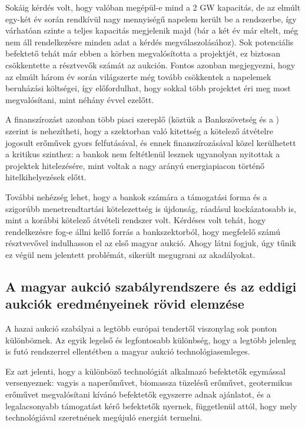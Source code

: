 \documentclass[twoside, magyar, showtrims]{corvinusphd}
\theoremstyle{plain}
\theoremstyle{remark}
\theoremstyle{definition}
\begin{document}
Sokáig kérdés volt, hogy valóban megépül-e mind a 2 GW kapacitás,
de az elmúlt egy-két év során rendkívül nagy mennyiségű
napelem került be a rendszerbe, így várhatóan szinte a teljes
kapacitás megjelenik majd (bár a két év 
már eltelt, még nem áll rendelkezésre minden adat
a kérdés megválaszolásához). Sok potenciális befektető tehát 
már ebben a körben megvalósította a projektjét, ez biztosan
csökkentette a résztvevők számát az aukción. Fontos azonban megjegyezni,
hogy az elmúlt három év során világszerte még tovább csökkentek 
a napelemek beruházási költségei, így előfordulhat, hogy
sokkal több projektet éri meg most megvalósítani, mint 
néhány évvel ezelőtt.

A finanszírozást azonban több piaci szereplő
(köztük a Bankszövetség és a ) szerint is nehezítheti,
hogy a szektorban való kitettség a kötelező átvételre
jogosult erőművek gyors felfutásával, 
és ennek finanszírozásával közel kerülhetett a kritikus szinthez:
a bankok nem feltétlenül lesznek ugyanolyan nyitottak
a projektek hitelezésére, mint voltak a nagy arányú
energiapiacon történő hitelkihelyezések előtt.

További nehézség lehet, 
hogy a bankok számára a támogatási forma  
és a szigorúbb menetrendtartási kötelezettség is újdonság,
ráadásul kockázatosabb is, mint a korábbi kötelező átvételi
rendszer volt. Kérdéses volt tehát, hogy rendelkezésre fog-e állni
kellő forrás a bankszektorból, hogy megfelelő számú
résztvevővel indulhasson el az első magyar aukció.
Ahogy látni fogjuk, úgy tűnik ez végül nem jelentett problémát,
sikerült megugrani az akadályokat.

\subsection{A magyar aukció szabályrendszere és az eddigi aukciók eredményeinek rövid elemzése}

A hazai aukció szabályai a legtöbb európai
tendertől viszonylag sok ponton különböznek.
Az egyik legelső és legfontosabb különbség,
hogy a legtöbb jelenleg is futó rendszerrel ellentétben
a magyar aukció technológiasemleges.

Ez azt jelenti, hogy a különböző technológiát
alkalmazó befektetők egymással versenyeznek:
vagyis a naperőművet, biomassza tüzelésű erőművet,
geotermikus erőművet megvalósítani kívánó befektetők egyszerre adnak
ajánlatot, és a legalacsonyabb támogatást
kérő befektetők nyernek, függetlenül attól,
hogy mely technológiával szeretnének megújuló energiát termelni.
\end{document}
